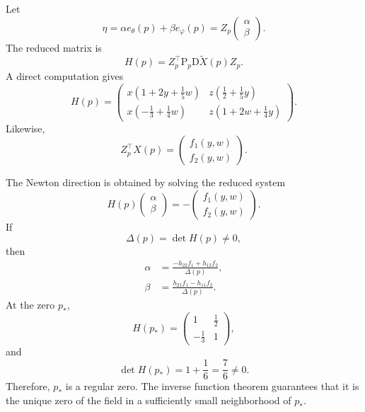 \documentclass[11pt]{article}
\newcommand{\D}{\mathrm{D}}
\newcommand{\Proj}{\mathrm{P}}
\begin{document}
Let
\[
    \eta
    =
    \alpha e_\theta(p)+\beta e_\varphi(p)
    =
    Z_p
    \begin{pmatrix}
        \alpha\\\beta
    \end{pmatrix}.
\]
The reduced matrix is
\[
    H(p)
    =
    Z_p^\top
    \Proj_p\D\widetilde X(p)Z_p.
\]
A direct computation gives
\begin{equation}\label{eq:H_product_torus}
    H(p)
    =
    \begin{pmatrix}
        x\left(1+2y+\frac15w\right)
        &
        z\left(\frac12+\frac15y\right)
        \\[2mm]
        x\left(-\frac13+\frac14w\right)
        &
        z\left(1+2w+\frac14y\right)
    \end{pmatrix}.
\end{equation}
Likewise,
\begin{equation}\label{eq:reduced_residual_product_torus}
    Z_p^\top X(p)
    =
    \begin{pmatrix}
        f_1(y,w)\\
        f_2(y,w)
    \end{pmatrix}.
\end{equation}

The Newton direction is obtained by solving the reduced system
\begin{equation}\label{eq:newton_system_product_torus}
    H(p)
    \begin{pmatrix}
        \alpha\\\beta
    \end{pmatrix}
    =
    -
    \begin{pmatrix}
        f_1(y,w)\\
        f_2(y,w)
    \end{pmatrix}.
\end{equation}
If
\[
    \Delta(p)=\det H(p)\neq0,
\]
then
\begin{align}
    \alpha
    &=
    \frac{
        -h_{22}f_1+h_{12}f_2
    }{\Delta(p)},
    \label{eq:alpha_product_torus}\\
    \beta
    &=
    \frac{
        h_{21}f_1-h_{11}f_2
    }{\Delta(p)}.
    \label{eq:beta_product_torus}
\end{align}
At the zero $p_\ast$,
\begin{equation}\label{eq:H_star_product_torus}
    H(p_\ast)
    =
    \begin{pmatrix}
        1&\frac12\\[1mm]
        -\frac13&1
    \end{pmatrix},
\end{equation}
and
\begin{equation}\label{eq:det_H_star_product_torus}
    \det H(p_\ast)
    =
    1+\frac16
    =
    \frac76
    \neq0.
\end{equation}
Therefore, $p_\ast$ is a regular zero. The inverse function theorem
guarantees that it is the unique zero of the field in a sufficiently small
neighborhood of $p_\ast$.
\end{document}
